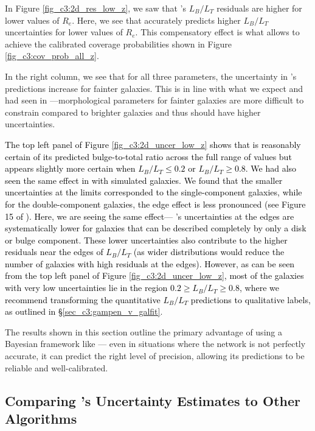 In Figure \ref{fig_c3:2d_res_low_z}, we saw that \gampen{}'s $L_B/L_T$ residuals are higher for lower values of $R_e$. Here, we see that \gampen{} accurately predicts higher $L_B/L_T$ uncertainties for lower values of $R_e$. This compensatory effect is what allows \gampen{} to achieve the calibrated coverage probabilities shown in Figure \ref{fig_c3:cov_prob_all_z}. 

In the right column, we see that for all three parameters, the uncertainty in \gampen{}'s predictions increase for fainter galaxies. This is in line with what we expect and had seen in \citet{gampen_software_paper}---morphological parameters for fainter galaxies are more difficult to constrain compared to brighter galaxies and thus should have higher uncertainties. 

\textcolor{black}{The top left panel of Figure \ref{fig_c3:2d_uncer_low_z} shows that \gampen{} is reasonably certain of its predicted %
bulge-to-total ratio across the full range of values but appears slightly more certain when $L_B/L_T \leq 0.2$ or $L_B/L_T \geq 0.8$. We had also seen the same effect in \citet{gampen_software_paper} with simulated galaxies. We found that the smaller uncertainties at the limits corresponded to the single-component galaxies, while for the double-component galaxies, the edge effect is less pronounced (see Figure 15 of \citet{gampen_software_paper}). Here, we are seeing the same effect--- \gampen{}'s uncertainties at the edges are systematically lower for galaxies that can be described completely by only a disk or bulge component. These lower uncertainties also contribute to the higher residuals near the edges of $L_B/L_T$ (as wider distributions would reduce the number of galaxies with high residuals at the edges). However, as can be seen from the top left panel of Figure \ref{fig_c3:2d_uncer_low_z}, most of the galaxies with very low uncertainties lie in the region $0.2 \geq L_B/L_T \geq 0.8$, where we recommend transforming the quantitative $L_B/L_T$ predictions to qualitative labels, as outlined in \S \ref{sec_c3:gampen_v_galfit}}.

The results shown in this section outline the primary advantage of using a Bayesian framework like \gampen{}--- even in situations where the network is not perfectly accurate, it can predict the right level of precision, allowing its predictions to be reliable and well-calibrated.

\subsection{Comparing \gampen{}'s Uncertainty Estimates to Other Algorithms}
\label{sec_c3:uncer_comp}

